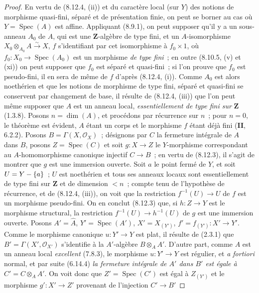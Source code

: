 \begin{proof}
En vertu de (8.12.4, (ii)) et du caractère local (sur $Y$) des notions de
morphisme quasi-fini, séparé et de présentation finie, on peut se borner au
cas où $Y=\operatorname{Spec}(A)$ est affine. Appliquant (8.9.1), on peut
supposer qu'il y a un sous-anneau $A_0$ de $A$, qui est une
$\mathbf Z$-algèbre de type fini, et un $A$-isomorphisme
$X_0\otimes_{A_0}A\xrightarrow{\sim}X$, $f$ s'identifiant par cet
isomorphisme à $f_0\times 1$, où
$f_0:X_0\to\operatorname{Spec}(A_0)$ est un morphisme \emph{de type fini}~;
en outre (8.10.5, (v) et (xi)) on peut supposer que $f_0$ est séparé et
quasi-fini~; si l'on prouve que $f_0$ est pseudo-fini, il en sera de même de
$f$ d'après (8.12.4, (i)). Comme $A_0$ est alors noethérien et que les
notions de morphisme de type fini, séparé et quasi-fini se conservent par
changement de base, il résulte de (8.12.4, (iii)) que l'on peut même supposer
que $A$ est un anneau local, \emph{essentiellement de type fini sur}
$\mathbf Z$ (1.3.8). Posons $n=\dim(A)$, et procédons par récurrence sur $n$~;
pour $n=0$, le théorème est évident, $A$ étant un corps et le morphisme $f$
étant déjà fini (\textbf{II}, 6.2.2). Posons $B=\Gamma(X,\mathcal O_X)$~; désignons
par $C$ la fermeture intégrale de $A$ dans $B$, posons
$Z=\operatorname{Spec}(C)$ et soit $g:X\to Z$ le $Y$-morphisme correspondant
au $A$-homomorphisme canonique injectif $C\to B$~; en vertu de (8.12.3), il
s'agit de montrer que $g$ est une immersion ouverte. Soit $a$ le point fermé
de $Y$, et soit $U=Y-\{a\}$~; $U$ est noethérien et tous ses anneaux locaux
sont essentiellement de type fini sur $\mathbf Z$ et de dimension $<n$~;
compte tenu de l'hypothèse de récurrence, et de (8.12.4, (iii)), on voit que
la restriction $f^{-1}(U)\to U$ de $f$ est un morphisme pseudo-fini. On en
conclut (8.12.3) que, si $h:Z\to Y$ est le morphisme structural, la
restriction $f^{-1}(U)\to h^{-1}(U)$ de $g$ est une immersion ouverte.
Posons $A'=\widehat A$, $Y'=\operatorname{Spec}(A')$,
$X'=X_{(Y')}$, $f'=f_{(Y')}:X'\to Y'$. Comme le morphisme canonique
$u:Y'\to Y$ est plat, il résulte de (2.3.1) que
$B'=\Gamma(X',\mathcal O_{X'})$ s'identifie à la $A'$-algèbre
$B\otimes_A A'$.
D'autre part, comme $A$ est un anneau local \emph{excellent} (7.8.3), le
morphisme $u:Y'\to Y$ est régulier, et \emph{a fortiori} normal, et par suite
(6.14.4) \emph{la fermeture intégrale de $A'$ dans $B'$ est égale à}
$C'=C\otimes_A A'$. On voit donc que $Z'=\operatorname{Spec}(C')$ est égal à
$Z_{(Y')}$ et le morphisme $g':X'\to Z'$ provenant de l'injection $C'\to B'$

\end{proof}
